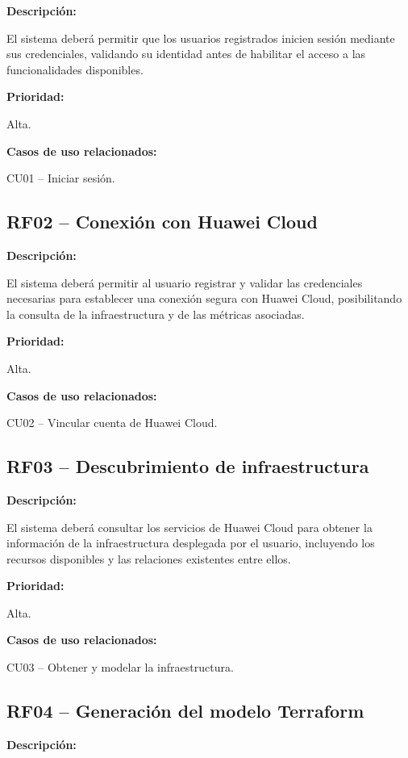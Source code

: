 \noindent \textbf{Descripción:}

El sistema deberá permitir que los usuarios registrados inicien sesión mediante sus credenciales, validando su identidad antes de habilitar el acceso a las funcionalidades disponibles.

\noindent \textbf{Prioridad:}

Alta.

\noindent \textbf{Casos de uso relacionados:}

\noindent CU01 -- Iniciar sesión.

\subsection{RF02 -- Conexión con Huawei Cloud}

\noindent \textbf{Descripción:}

El sistema deberá permitir al usuario registrar y validar las credenciales necesarias para establecer una conexión segura con Huawei Cloud, posibilitando la consulta de la infraestructura y de las métricas asociadas.

\noindent \textbf{Prioridad:}

Alta.

\noindent \textbf{Casos de uso relacionados:}

\noindent CU02 -- Vincular cuenta de Huawei Cloud.

\subsection{RF03 -- Descubrimiento de infraestructura}

\noindent \textbf{Descripción:}

El sistema deberá consultar los servicios de Huawei Cloud para obtener la información de la infraestructura desplegada por el usuario, incluyendo los recursos disponibles y las relaciones existentes entre ellos.

\noindent \textbf{Prioridad:}

Alta.

\noindent \textbf{Casos de uso relacionados:}

\noindent CU03 -- Obtener y modelar la infraestructura.

\subsection{RF04 -- Generación del modelo Terraform}

\noindent \textbf{Descripción:}

